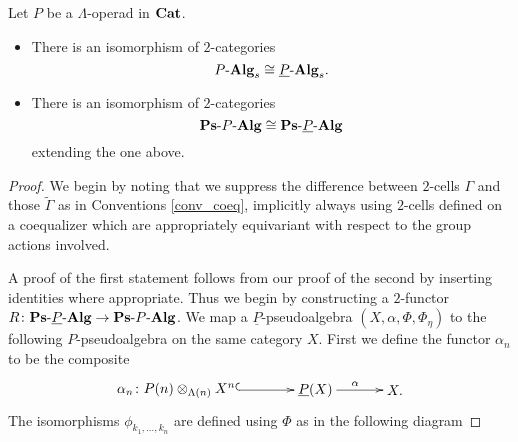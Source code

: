 \begin{thm}\label{thm:2monad=op}
Let $P$ be a $\Lambda$-operad in $\mathbf{Cat}$.
\begin{itemize}
\item There is an isomorphism of $2$-categories
    \[
        P\mbox{-}\mathbf{Alg}_{s} \cong \underline{P}\mbox{-}\mathbf{Alg}_{s}.
    \]
\item There is an isomorphism of $2$-categories
    \[
        \mathbf{Ps}\mbox{-}P\mbox{-}\mathbf{Alg} \cong \mathbf{Ps}\mbox{-}\underline{P}\mbox{-}\mathbf{Alg}
    \]
    extending the one above.
\end{itemize}
\end{thm}
\begin{proof}
We begin by noting that we suppress the difference between $2$-cells $\Gamma$ and those $\tilde{\Gamma}$ as in Conventions \ref{conv_coeq}, implicitly always using $2$-cells defined on a coequalizer which are appropriately equivariant with respect to the group actions involved.

A proof of the first statement follows from our proof of the second by inserting identities where appropriate. Thus we begin by constructing a $2$-functor $R \colon \mathbf{Ps}\mbox{-}\underline{P}\mbox{-}\mathbf{Alg} \rightarrow \mathbf{Ps}\mbox{-}P\mbox{-}\mathbf{Alg}$. We map a $\underline{P}$-pseudoalgebra $(X,\alpha,\Phi,\Phi_\eta)$ to the following $P$-pseudoalgebra on the same category $X$. First we define the functor $\alpha_n$ to be the composite
    \[
        \xy
            (0,0)*+{\alpha_n \colon \coeq{P}{X}{\Lambda}{n}}="00";
            (35,0)*+{\underline{P}(X)}="10";
            (55,0)*+{X.}="20";
            {\ar@{^{(}->} "00" ; "10"};
            {\ar^{\alpha} "10" ; "20"};
        \endxy
    \]
The isomorphisms $\phi_{k_1,\ldots,k_n}$ are defined using $\Phi$ as in the following diagram


\end{proof}
